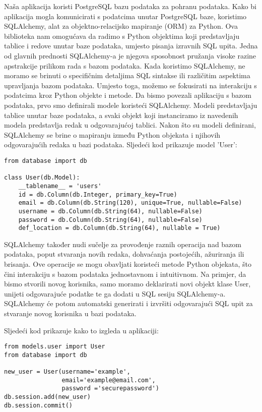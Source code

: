 \documentclass[times, utf8, zavrsni]{fer}
\begin{document}
Naša aplikacija koristi PostgreSQL \cite{postgresql} bazu podataka za pohranu podataka. Kako bi aplikacija mogla komunicirati s podatcima unutar PostgreSQL baze, koristimo SQLAlchemy, alat za objektno-relacijsko mapiranje (ORM) za Python. Ova biblioteka nam omogućava da radimo s Python objektima koji predstavljaju tablice i redove unutar baze podataka, umjesto pisanja izravnih SQL upita. Jedna od glavnih prednosti SQLAlchemy-a je njegova sposobnost pružanja visoke razine apstrakcije prilikom rada s bazom podataka. Kada koristimo SQLAlchemy, ne moramo se brinuti o specifičnim detaljima SQL sintakse ili različitim aspektima upravljanja bazom podataka. Umjesto toga, možemo se fokusirati na interakciju s podatcima kroz Python objekte i metode. Da bismo povezali aplikaciju s bazom podataka, prvo smo definirali modele koristeći SQLAlchemy. Modeli predstavljaju tablice unutar baze podataka, a svaki objekt koji instanciramo iz navedenih modela predstavlja redak u odgovarajućoj tablici. Nakon što su modeli definirani, SQLAlchemy se brine o mapiranju između Python objekata i njihovih odgovarajućih redaka u bazi podataka. Sljedeći kod prikazuje model 'User':
\begin{verbatim}
from database import db

class User(db.Model):
    __tablename__ = 'users'
    id = db.Column(db.Integer, primary_key=True)
    email = db.Column(db.String(120), unique=True, nullable=False)
    username = db.Column(db.String(64), nullable=False)
    password = db.Column(db.String(64), nullable=False)
    def_location = db.Column(db.String(64), nullable = True)
\end{verbatim}
SQLAlchemy također nudi sučelje za provođenje raznih operacija nad bazom podataka, poput stvaranja novih redaka, dohvaćanja postojećih, ažuriranja ili brisanja. Ove operacije se mogu obavljati koristeći metode Python objekata, što čini interakciju s bazom podataka jednostavnom i intuitivnom. Na primjer, da bismo stvorili novog korisnika, samo moramo deklarirati novi objekt klase User, unijeti odgovarajuće podatke te ga dodati u SQL sesiju SQLAlchemy-a. SQLAlchemy će potom automatski generirati i izvršiti odgovarajući SQL upit za stvaranje novog korisnika u bazi podataka.

Sljedeći kod prikazuje kako to izgleda u aplikaciji:
\begin{verbatim}
from models.user import User
from database import db

new_user = User(username='example', 
                email='example@email.com', 
                password ='securepassword')
db.session.add(new_user)
db.session.commit()
\end{verbatim}
\end{document}

